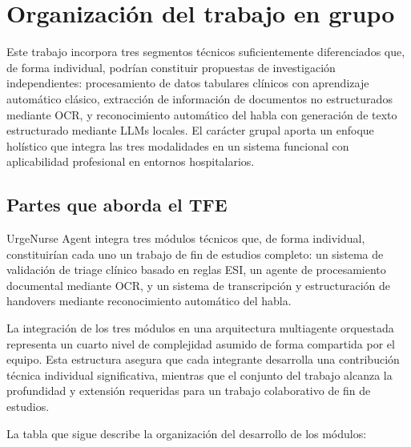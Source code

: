 \section*{Organización del trabajo en grupo}
Este trabajo incorpora tres segmentos técnicos suficientemente diferenciados que, de forma individual, podrían constituir propuestas de investigación independientes: procesamiento de datos tabulares clínicos con aprendizaje automático clásico, extracción de información de documentos no estructurados mediante OCR, y reconocimiento automático del habla con generación de texto estructurado mediante LLMs locales. El carácter grupal aporta un enfoque holístico que integra las tres modalidades en un sistema funcional con aplicabilidad profesional en entornos hospitalarios.


\subsection*{Partes que aborda el TFE}
UrgeNurse Agent integra tres módulos técnicos que, de forma individual, constituirían cada uno un trabajo de fin de estudios completo: un sistema de validación de triage clínico basado en reglas ESI, un agente de procesamiento documental mediante OCR, y un sistema de transcripción y estructuración de handovers mediante reconocimiento automático del habla.

La integración de los tres módulos en una arquitectura multiagente orquestada representa un cuarto nivel de complejidad asumido de forma compartida por el equipo. Esta estructura asegura que cada integrante desarrolla una contribución técnica individual significativa, mientras que el conjunto del trabajo alcanza la profundidad y extensión requeridas para un trabajo colaborativo de fin de estudios.

La tabla que sigue describe la organización del desarrollo de los módulos:

